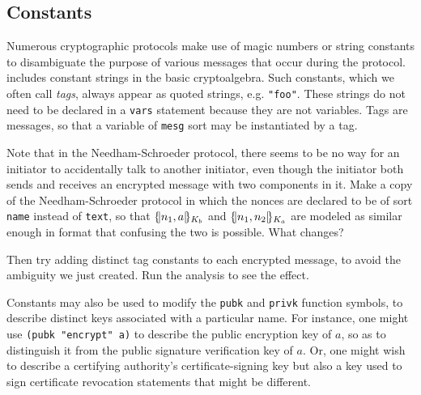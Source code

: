 \subsection{Constants}
   Numerous cryptographic
protocols make use of magic numbers or string constants to
disambiguate the purpose of various messages that occur during the
protocol.  {\cpsa} includes constant strings in the basic
cryptoalgebra.  Such constants, which we often call \emph{tags},
always appear as quoted strings, e.g. \texttt{"foo"}.  These strings
do not need to be declared in a \texttt{vars} statement because they
are not variables.  Tags are messages, so that a variable of
\verb|mesg| sort may be instantiated by a tag.


\begin{exercise}
Note that in the Needham-Schroeder protocol, there seems to be no way
for an initiator to accidentally talk to another initiator, even though
the initiator both sends and receives an encrypted message with two
components in it.  Make a copy of the Needham-Schroeder protocol in which
the nonces are declared to be of sort \texttt{name} instead of \texttt{text},
so that $\{\!|n_1,a|\!\}_{K_b}$ and $\{\!|n_1,n_2|\!\}_{K_a}$ are modeled as similar
enough in format that confusing the two is possible.  What changes?

Then try adding distinct tag constants to each encrypted message, to
avoid the ambiguity we just created.  Run the analysis to see the
effect.
\end{exercise}

Constants may also be used to modify the \texttt{pubk} and
\texttt{privk} function symbols, to describe distinct keys associated
with a particular name.  For instance, one might use \texttt{(pubk
  "encrypt" a)} to describe the public encryption key of $a$, so as to
distinguish it from the public signature verification key of $a$.  Or,
one might wish to describe a certifying authority's
certificate-signing key but also a key used to sign certificate
revocation statements that might be different.

